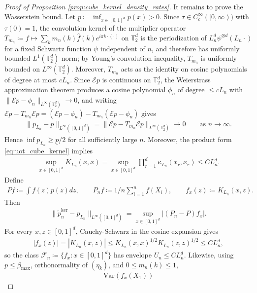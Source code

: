 \documentclass[11pt,reqno]{amsart}
\theoremstyle{definition}
\renewcommand{\hat}{\widehat}
\renewcommand{\tilde}{\widetilde}
\begin{document}
\begin{proof}[Proof of Proposition \ref{prop:cube_kernel_density_rates}]
It remains to prove the Wasserstein bound.
Let $\underline p \coloneqq \inf_{x\in[0,1]^d} p(x)>0$.
Since $\tau\in C_c^\infty([0,\infty))$ with $\tau(0)=1$, the convolution kernel of the multiplier operator $T_{m_n}\coloneqq f\mapsto \sum_k m_n(k)\hat f(k)e^{i\pi k\cdot( \cdot )}$ on $\mathbb T_2^d$ is the periodization of $L_n^d \psi^{\otimes d}(L_n \cdot )$ for a fixed Schwartz function $\psi$ independent of $n$, and therefore has uniformly bounded $L^1(\mathbb T_2^d)$ norm; by Young's convolution inequality, $T_{m_n}$ is uniformly bounded on $L^\infty(\mathbb T_2^d)$. Moreover, $T_{m_n}$ acts as the identity on cosine polynomials of degree at most $cL_n$. Since $\mathcal Ep$ is continuous on $\mathbb T_2^d$, the Weierstrass approximation theorem produces a cosine polynomial $\phi_n$ of degree $\le cL_n$ with $\|\mathcal Ep-\phi_n\|_{L^\infty(\mathbb T_2^d)}\to 0$, and writing $\mathcal Ep-T_{m_n}\mathcal Ep=(\mathcal Ep-\phi_n)-T_{m_n}(\mathcal Ep-\phi_n)$ gives
\begin{align*}
    \|p_{L_n}-p\|_{L^\infty([0,1]^d)}
    =
    \|\mathcal Ep-T_{m_n}\mathcal Ep\|_{L^\infty(\mathbb T_2^d)}
    \to 0
    \qquad \text{as }n\to\infty.
\end{align*}
Hence $\inf p_{L_n}\ge \underline p/2$ for all sufficiently large $n$.
Moreover, the product form \eqref{eq:uot_cube_kernel} implies
\begin{align*}
    \sup_{x\in[0,1]^d} K_{L_n}(x,x)
    =
    \sup_{x\in[0,1]^d}
    \prod_{r=1}^d \kappa_{L_n}(x_r,x_r)
    \le
    C L_n^d.
\end{align*}
Define
\begin{align*}
    P f \coloneqq \int f(z)p(z)dz,
    \qquad
    P_n f \coloneqq {1/n}\sum_{i=1}^n f(X_i),
    \qquad
    f_x(z) \coloneqq K_{L_n}(x,z).
\end{align*}
Then
\begin{align*}
    \|\tilde p_n^{\mathrm{ker}}-p_{L_n}\|_{L^\infty([0,1]^d)}
    =
    \sup_{x\in[0,1]^d}|(P_n-P)f_x|.
\end{align*}
For every $x,z\in[0,1]^d$, Cauchy-Schwarz in the cosine expansion gives
\begin{align*}
    |f_x(z)|
    =
    |K_{L_n}(x,z)|
    \le
    K_{L_n}(x,x)^{1/2}K_{L_n}(z,z)^{1/2}
    \le
    C L_n^d,
\end{align*}
so the class $\mathcal F_n\coloneqq\{f_x:x\in[0,1]^d\}$ has envelope $U_n\le C L_n^d$.
Likewise, using $p\le \beta_{\max}$, orthonormality of $(\eta_k)$, and $0\le m_n(k)\le 1$,
\begin{align*}
    \mathrm{Var}(f_x(X_1))

\end{align*}
\end{proof}
\end{document}
